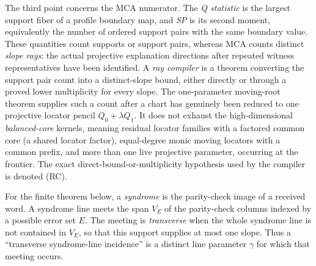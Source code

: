 \documentclass[12pt,a4paper]{amsart}
\numberwithin{equation}{section}
\theoremstyle{remark}
\begin{document}
The third point concerns the MCA numerator.  The \emph{Q statistic} is the
largest support fiber of a profile boundary map, and \emph{SP} is its
second moment, equivalently the number of ordered support pairs with the
same boundary value.  These quantities count supports or support pairs,
whereas MCA counts distinct \emph{slope rays}: the actual projective
explanation directions after repeated witness representatives have been
identified.  A \emph{ray compiler} is a theorem converting the support
pair count into a distinct-slope bound, either directly or through a
proved lower multiplicity for every slope.  The one-parameter moving-root
theorem supplies such a count after a chart has genuinely been reduced to
one projective locator pencil \(Q_0+\lambda Q_1\).  It does not exhaust the high-dimensional
\emph{balanced-core} kernels, meaning residual locator families with a
factored common core (a shared locator factor), equal-degree monic moving locators with a common
prefix, and more than one live projective parameter, occurring
at the frontier.  The exact direct-bound-or-multiplicity hypothesis used by
the compiler is denoted \textup{(RC)}.

For the finite theorem below, a \emph{syndrome} is the parity-check image
of a received word.  A syndrome line meets the span \(V_E\) of the
parity-check columns indexed by a possible error set \(E\).  The meeting is
\emph{transverse} when the whole syndrome line is not contained in
\(V_E\), so that this support supplies at most one slope.  Thus a
``transverse syndrome-line incidence'' is a distinct line parameter
\(\gamma\) for which that meeting occurs.
\end{document}
